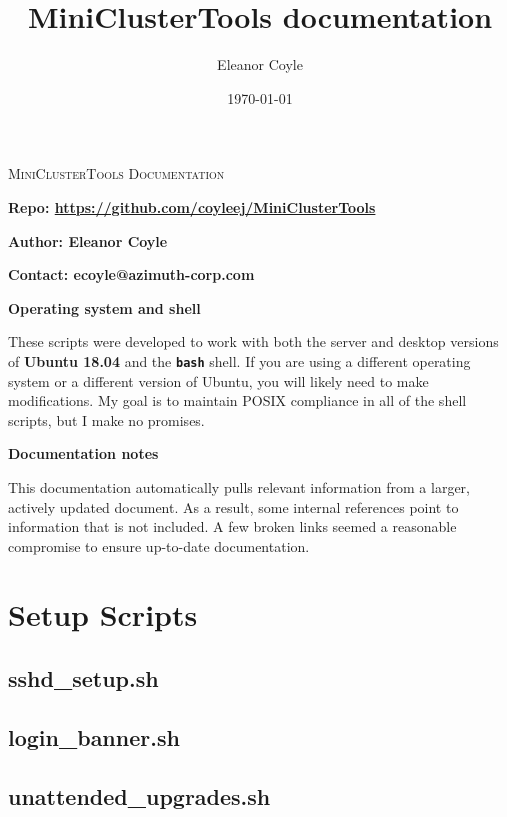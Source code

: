 \documentclass[10pt,letterpaper]{report}
\title{MiniClusterTools documentation}
\author{Eleanor Coyle}
\date{\today}
\begin{document}
\begin{titlepage}
	\centering
	\vfill
	{\huge\scshape MiniClusterTools Documentation\par}

	\vspace{2cm}
	\textbf{Repo: \href{https://github.com/coyleej/MiniClusterTools}{https://github.com/coyleej/MiniClusterTools}}

	\vspace{1cm}
	\textbf{Author: Eleanor Coyle}\par
	\textbf{Contact: ecoyle@azimuth-corp.com}

	\vfill
	\textbf{Operating system and shell} \par
	These scripts were developed to work with both the server and desktop versions of \textbf{Ubuntu 18.04} and the \textbf{\texttt{bash}} shell. If you are using a different operating system or a different version of Ubuntu, you will likely need to make modifications. My goal is to maintain POSIX compliance in all of the shell scripts, but I make no promises.

	\vspace{1cm}
	\textbf{Documentation notes} \par
	This documentation automatically pulls relevant information from a larger, actively updated document. 
	As a result, some internal references point to information that is not included. 
	A few broken links seemed a reasonable compromise to ensure up-to-date documentation.

\end{titlepage}

\tableofcontents

\chapter{Setup Scripts}				\label{ch:setup}

\section{sshd\_setup.sh}			\label{sec:openssh}
	

\section{login\_banner.sh}			\label{sec:login}
	

\section{unattended\_upgrades.sh}	\label{sec:mandatoryautoupgrades}
	
\end{document}
